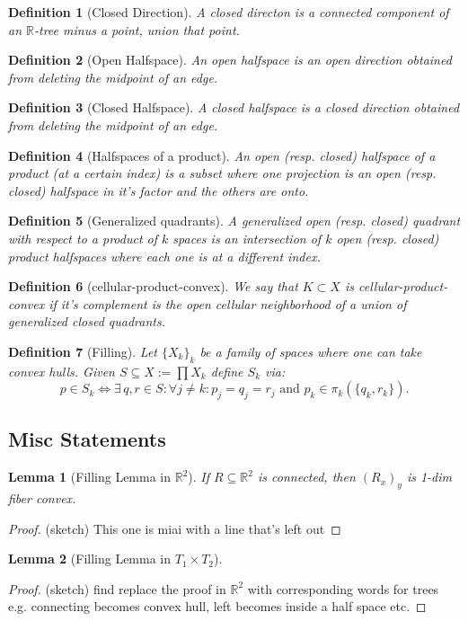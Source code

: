 \documentclass{article}
\newcommand{\rxy}{(R_x)_y}
\theoremstyle{mystyle}
\newtheorem{lem}{Lemma}[section]
\newtheorem{defn}{Definition}
\theoremstyle{remark}
\begin{document}
\begin{defn}[Closed Direction] A closed directon is a connected component of an \(\mathbb{R}\)-tree minus a point, union that point.
\end{defn}
\begin{defn}[Open Halfspace] An open halfspace is an open direction obtained from deleting the midpoint of an edge.
\end{defn}
\begin{defn}[Closed Halfspace] A closed halfspace is a closed direction obtained from deleting the midpoint of an edge.
\end{defn}
\begin{defn}[Halfspaces of a product] An open (resp. closed) halfspace of a product (at a certain index) is a subset where one projection is an open (resp. closed)  halfspace in it's factor and the others are onto.
\end{defn}
\begin{defn}[Generalized quadrants] A generalized open (resp. closed) quadrant with respect to a product of \(k\) spaces is an intersection of \(k\) open (resp. closed) product halfspaces where each one is at a different index.
\end{defn}
\begin{defn}[cellular-product-convex] We say that \(K \subset X\) is cellular-product-convex if it's complement is the open cellular neighborhood of a union of generalized closed quadrants.
\end{defn}

\begin{defn}
	[Filling]
	Let \(\{X_{k}\}_{k}\) be a family of spaces where one can take convex hulls. Given \(S \subseteq X := \prod X_{k}\) define \(S_{k}\) via: \[p \in S_{k} \iff \exists \,q,r \in S: \forall j \neq k: p_{j} = q_{j} = r_{j} \text{ and } p_{k} \in \pi_{k} (\{q_{k} , r_{k}\}).\] 
\end{defn}

\subsection{Misc Statements}

\begin{lem}
    [Filling Lemma in \(\mathbb{R}^{2}\)]
	\label{lem:fillr2}
	If \(R \subseteq \mathbb{R}^{2}\) is connected, then \(\rxy\) is 1-dim fiber convex.
\end{lem}
\begin{proof}
    (sketch) This one is miai with a line that's left out
\end{proof}
\begin{lem}
    [Filling Lemma in \(T_{1} \times T_{2}\)]
	\label{lem:fillt2}
\end{lem}
\begin{proof}
    (sketch) find replace the proof in \(\mathbb{R}^{2}\) with corresponding words for trees e.g. connecting becomes convex hull, left becomes inside a half space etc.
\end{proof}
\end{document}
